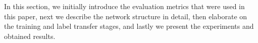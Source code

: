 \documentclass[10pt,twocolumn,letterpaper]{article}
\newcommand{\HB}[1]{{\color{blue}{HB: #1}}} %
\begin{document}
In this section, we initially introduce the evaluation metrics that were used in this paper, next we describe the network structure in detail, then elaborate on the training and label transfer stages, and lastly we present the experiments and obtained results.
\end{document}
